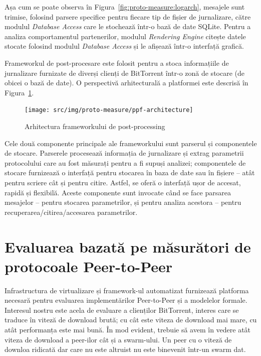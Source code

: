 Așa cum se poate observa în Figura~\ref{fig:proto-measure:logarch},
mesajele sunt trimise, folosind parsere specifice pentru fiecare tip de fișier
de jurnalizare, către modulul \textit{Database Access} care le stochează
într-o bază de date SQLite. Pentru a analiza comportamentul partenerilor,
modulul \textit{Rendering Engine} citește datele stocate folosind modulul
\textit{Database Access} și le afișează într-o interfață grafică.

Frameworkul de post-procesare este folosit pentru a stoca informațiile de
jurnalizare furnizate de diverși clienți de BitTorrent într-o zonă de stocare
(de obicei o bază de date). O perspectivă arhitecturală a platformei este
descrisă în Figura~\ref{fig:proto-measure:ppf-architecture}.

\begin{figure}[h]
  \begin{center}
    \texttt{[image: src/img/proto-measure/ppf-architecture]}
  \end{center}
  \caption{Arhitectura frameworkului de post-processing}
  \label{fig:proto-measure:ppf-architecture}
\end{figure}

Cele două componente principale ale frameworkului sunt parserul și componentele
de stocare. Parserele procesează informația de jurnalizare și extrag parametrii
protocolului care au fost măsurați pentru a fi supuși analizei; componentele
de stocare furnizează o interfață pentru stocarea în baza de date sau în fișiere
-- atât pentru scriere cât și pentru citire. Astfel, se oferă o interfață
ușor de accesat, rapidă și flexibilă. Aceste componente sunt invocate când
se face parsarea mesajelor -- pentru stocarea parametrilor, și pentru
analiza acestora -- pentru recuperarea/citirea/accesarea parametrilor.

\section{Evaluarea bazată pe măsurători de protocoale Peer-to-Peer}
\label{sec:proto-measure:eval-swarm}

Infrastructura de virtualizare și framework-ul automatizat furnizează
platforma necesară pentru evaluarea implementărilor Peer-to-Peer și a
modelelor formale. Interesul nostru este acela de evaluare a clienților
BitTorrent, interes care se traduce în viteză de download brută; cu cât este
viteza de download mai mare, cu atât performanța este mai bună. În mod
evident, trebuie să avem în vedere atât viteza de download a peer-ilor cât și
a swarm-ului. Un peer cu o viteză de downloa ridicată dar care nu este
altruist nu este binevenit într-un swarm dat.

